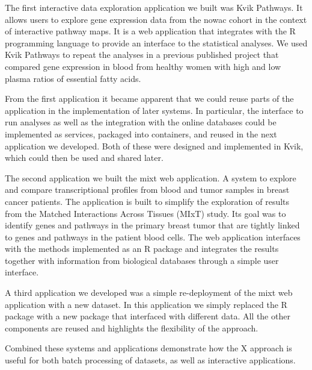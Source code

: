 The first interactive data exploration application we built was Kvik Pathways.
It allows users to explore gene expression data from the \gls{nowac} cohort in
the context of interactive pathway maps.\cite{pathways} It is a web application
that integrates with the R programming language to provide an interface to the
statistical analyses. We used Kvik Pathways to repeat the analyses in a previous
published project that compared gene expression in blood from healthy women with
high and low plasma ratios of essential fatty acids.\cite{olsen2013plasma}

From the first application it became apparent that we could reuse parts of the
application in the implementation of later systems. In particular, the interface
to run analyses as well as the integration with the online databases could be
implemented as services, packaged into containers, and reused in the next
application we developed. Both of these were designed and implemented in Kvik,
which could then be used and shared later. 

The second application we built the \gls{mixt} web application. A system to
explore and compare transcriptional profiles from blood and tumor samples in
breast cancer patients. The application is built to simplify the exploration of
results from the Matched Interactions Across Tissues (MIxT) study. Its goal was
to identify genes and pathways in the primary breast tumor that are tightly
linked to genes and pathways in the patient blood
cells.\cite{dumeaux2017interactions} The web application interfaces with the
methods implemented as an R package and integrates the results together with
information from biological databases through a simple user interface. 

A third application we developed was a simple re-deployment of the \gls{mixt}
web application with a new dataset. In this application we simply replaced the R
package with a new package that interfaced with different data. All the other
components are reused and highlights the flexibility of the approach. 

Combined these systems and applications demonstrate how the X approach is useful
for both batch processing of datasets, as well as interactive applications. 


